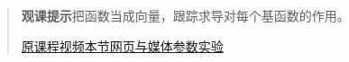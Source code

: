 \begin{quote}\small\textbf{观课提示}\quad 把函数当成向量，跟踪求导对每个基函数的作用。

\href{https://www.youtube.com/watch?v=TgKwz5Ikpc8}{原课程视频}\quad\href{https://vitael04213.github.io/3blue1brown-notes/lessons/abstract-vector-spaces.html}{本节网页与媒体}\quad\href{https://vitael04213.github.io/3blue1brown-notes/lab.html\#vectors}{参数实验}
\end{quote}
